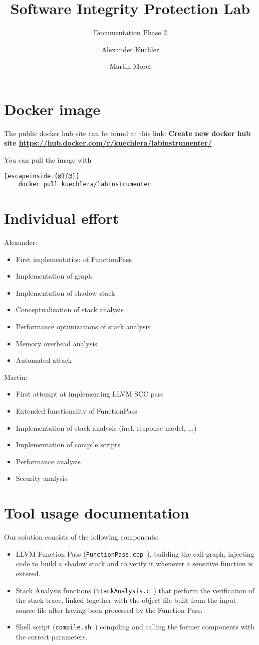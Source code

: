 \documentclass{llncs}
\title{Software Integrity Protection Lab}
\subtitle{Documentation Phase 2}
\author{Alexander K\"uchler \and Martin Morel}
\institute{Technical University of Munich\\
Department of Computer Science\\
\email{kuechler@in.tum.de}, \email{martin.morel@tum.de}}
\newcommand{\todo}[1]{\textbf{\color{red} #1}}
\newcommand{\llvmpass}{\texttt{FunctionPass.cpp }}
\newcommand{\stacka}{\texttt{StackAnalysis.c }}
\newcommand{\script}{\texttt{compile.sh }}
\begin{document}
\maketitle

\section{Docker image}
The public docker hub site can be found at this link: \todo{Create new docker hub site \url{https://hub.docker.com/r/kuechlera/labinstrumenter/}}

You can pull the image with
\begin{lstlisting}[escapeinside={@}{@}]
    docker pull kuechlera/labinstrumenter
\end{lstlisting}

\section{Individual effort}
Alexander:
\begin{itemize}
  \item First implementation of FunctionPass
  \item Implementation of graph
  \item Implementation of shadow stack
  \item Conceptualization of stack analysis
  \item Performance optimizations of stack analysis
  \item Memory overhead analysis
  \item Automated attack
\end{itemize}
Martin:
\begin{itemize}
  \item First attempt at implementing LLVM SCC pass
  \item Extended functionality of FunctionPass
  \item Implementation of stack analysis (incl. response model, ...)
  \item Implementation of compile scripts
  \item Performance analysis
  \item Security analysis
\end{itemize}

\newpage

\section{Tool usage documentation}
Our solution consists of the following components:
\begin{itemize}
  \item LLVM Function Pass (\llvmpass), building the call graph, injecting code to build a shadow stack and to verify it whenever a sensitive function is entered.
  \item Stack Analysis functions (\stacka) that perform the verification of the stack trace, linked together with the object file built from the input source file after having been processed by the Function Pass.
  \item Shell script (\script) compiling and calling the former components with the correct parameters.
\end{itemize}
\end{document}
